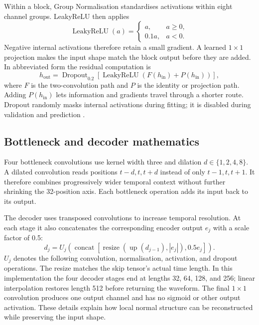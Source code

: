 Within a block, Group Normalisation standardises activations within eight
channel groups. LeakyReLU then applies
\begin{equation}
 \operatorname{LeakyReLU}(a)=\begin{cases}a,&a\geq0,\\0.1a,&a<0.\end{cases}
\end{equation}
Negative internal activations therefore retain a small gradient. A learned
$1\times1$ projection makes the input shape match the block output before
they are added. In abbreviated form the residual computation is
\begin{equation}
 h_{\mathrm{out}}=
 \operatorname{Dropout}_{0.2}\!\left[
 \operatorname{LeakyReLU}\!\left(F(h_{\mathrm{in}})+P(h_{\mathrm{in}})\right)
 \right],
 \label{eq:method-residual-block}
\end{equation}
where $F$ is the two-convolution path and $P$ is the identity or projection
path. Adding $P(h_{\mathrm{in}})$ lets information and gradients travel through
a shorter route. Dropout randomly masks internal activations during fitting;
it is disabled during validation and prediction
\cite{he2016resnet,srivastava2014dropout}.

\subsection{Bottleneck and decoder mathematics}

Four bottleneck convolutions use kernel width three and dilation
$d\in\{1,2,4,8\}$. A dilated convolution reads positions
$t-d,t,t+d$ instead of only $t-1,t,t+1$. It therefore combines progressively
wider temporal context without further shrinking the 32-position axis.
Each bottleneck operation adds its input back to its output.

The decoder uses transposed convolutions to increase temporal resolution.
At each stage it also concatenates the corresponding encoder output $e_j$
with a scale factor of 0.5:
\begin{equation}
 d_j=U_j\!\left(
 \operatorname{concat}\!\left[
 \operatorname{resize}(\operatorname{up}(d_{j-1}),|e_j|),
 0.5e_j\right]\right).
 \label{eq:method-decoder-skip}
\end{equation}
$U_j$ denotes the following convolution, normalisation, activation, and
dropout operations. The resize matches the skip tensor's actual time length.
In this implementation the four decoder stages end at lengths 32, 64, 128,
and 256; linear interpolation restores length 512 before returning the
waveform. The final $1\times1$ convolution produces one output channel and
has no sigmoid or other output activation. These details explain how local
normal structure can be reconstructed while preserving the input shape.

